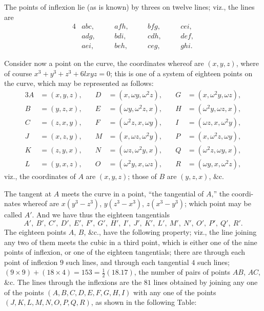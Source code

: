 \documentclass[11pt,a4paper]{article}
\begin{document}
The points of inflexion lie (as is known) by threes on twelve lines; viz., the lines are
\begin{alignat*}{4}
&abc, &\quad &afh, &\quad &bfg, &\quad &cei,\\
&adg, &\quad &bdi, &\quad &cdh, &\quad &def,\\
&aei, &\quad &beh, &\quad &ceg, &\quad &ghi.
\end{alignat*}

Consider now a point on the curve, the coordinates whereof are $(x, y, z)$, where of
course $x^3+y^3+z^3+6lxyz=0$; this is one of a system of eighteen points on the curve,
which may be represented as follows:
\begin{alignat*}{3}
A &= (x, y, z), &\quad D &= (x, \omega y, \omega^2z), &\quad G &= (x, \omega^2y, \omega z),\\
B &= (y, z, x), &\quad E &= (\omega y, \omega^2z, x), &\quad H &= (\omega^2y, \omega z, x),\\
C &= (z, x, y), &\quad F &= (\omega^2z, x, \omega y), &\quad I &= (\omega z, x, \omega^2y),\\
J &= (x, z, y), &\quad M &= (x, \omega z, \omega^2y), &\quad P &= (x, \omega^2z, \omega y),\\
K &= (z, y, x), &\quad N &= (\omega z, \omega^2y, x), &\quad Q &= (\omega^2z, \omega y, x),\\
L &= (y, x, z), &\quad O &= (\omega^2y, x, \omega z), &\quad R &= (\omega y, x, \omega^2z),
\end{alignat*}
viz., the coordinates of $A$ are $(x, y, z)$; those of $B$ are $(y, z, x)$, \&c.

The tangent at $A$ meets the curve in a point, ``the tangential of $A$,'' the coordi-
\noindent nates whereof are $x(y^3-z^3)$, $y(z^3-x^3)$, $z(x^3-y^3)$; which point may be called $A'$. And
we have thus the eighteen tangentials
\[
A',\ B',\ C',\ D',\ E',\ F',\ G',\ H',\ I',\ J',\ K',\ L',\ M',\ N',\ O',\ P',\ Q',\ R'.
\]
The eighteen points $A$, $B$, \&c., have the following property; viz., the line joining any
two of them meets the cubic in a third point, which is either one of the nine points
of inflexion, or one of the eighteen tangentials; there are through each point of inflexion
$9$ such lines, and through each tangential $4$ such lines; $(9 \times 9) + (18 \times 4) = 153 = \frac12(18.17)$,
the number of pairs of points $AB$, $AC$, \&c. The lines through the inflexions are the
$81$ lines obtained by joining any one of the points $(A, B, C, D, E, F, G, H, I)$ with
any one of the points $(J, K, L, M, N, O, P, Q, R)$, as shown in the following Table:
\end{document}
